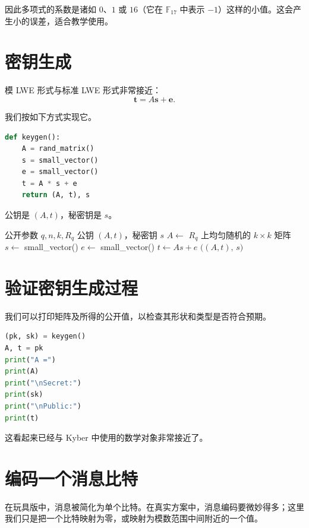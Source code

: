 因此多项式的系数是诸如 $0$、$1$ 或 $16$（它在 $\mathbb{F}_{17}$ 中表示 $-1$）这样的小值。这会产生小的误差，适合教学使用。

\section{密钥生成}

模 LWE 形式与标准 LWE 形式非常接近：
\[
\mathbf{t}=A\mathbf{s}+\mathbf{e}.
\]

我们按如下方式实现它。

\begin{lstlisting}[language=Python]
def keygen():
    A = rand_matrix()
    s = small_vector()
    e = small_vector()
    t = A * s + e
    return (A, t), s
\end{lstlisting}

公钥是 $(A,t)$，秘密钥是 $s$。

\begin{algorithm}[H]
\caption{玩具版 KeyGen}
\label{alg:toy-keygen}
\begin{algorithmic}[1]
\Require 公开参数 $q,n,k,R_q$
\Ensure 公钥 $(A,t)$，秘密钥 $s$
\State $A \gets$ $R_q$ 上均匀随机的 $k\times k$ 矩阵
\State $s \gets$ small\_vector() 
\State $e \gets$ small\_vector()
\State $t \gets A s + e$
\State \Return $\big((A,t),\, s\big)$
\end{algorithmic}
\end{algorithm}

\section{验证密钥生成过程}

我们可以打印矩阵及所得的公开值，以检查其形状和类型是否符合预期。

\begin{lstlisting}[language=Python]
(pk, sk) = keygen()
A, t = pk
print("A =")
print(A)
print("\nSecret:")
print(sk)
print("\nPublic:")
print(t)
\end{lstlisting}

这看起来已经与 Kyber 中使用的数学对象非常接近了。

\section{编码一个消息比特}

在玩具版中，消息被简化为单个比特。在真实方案中，消息编码要微妙得多；这里我们只是把一个比特映射为零，或映射为模数范围中间附近的一个值。


